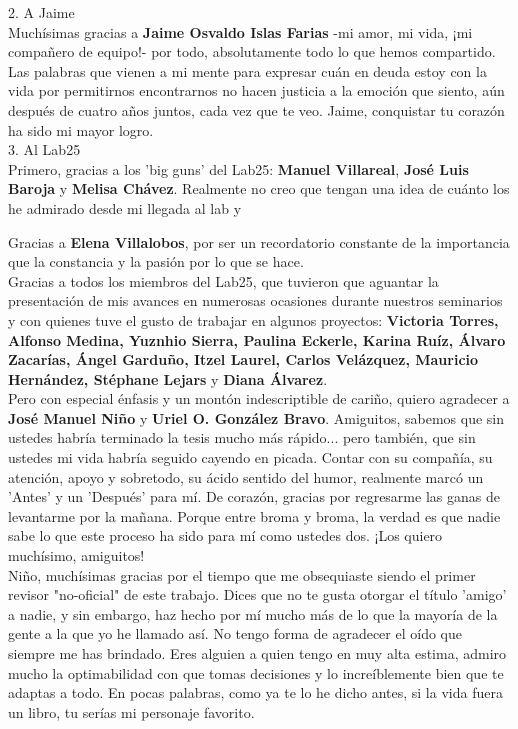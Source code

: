 \documentclass[
12pt, %
spanish, %
singlespacing, %
headsepline, %
]{MastersDoctoralThesis} %
\begin{document}
\begin{acknowledgements}
2. A Jaime\\

Muchísimas gracias a \textbf{Jaime Osvaldo Islas Farias} -mi amor, mi vida, ¡mi compañero de equipo!- por todo, absolutamente todo lo que hemos compartido. Las palabras que vienen a mi mente para expresar cuán en deuda estoy con la vida por permitirnos encontrarnos no hacen justicia a la emoción que siento, aún después de cuatro años juntos, cada vez que te veo. Jaime, conquistar tu corazón ha sido mi mayor logro.\\

3. Al Lab25\\

Primero, gracias a los 'big guns' del Lab25: \textbf{Manuel Villareal}, \textbf{José Luis Baroja} y \textbf{Melisa Chávez}. Realmente no creo que tengan una idea de cuánto los he admirado desde mi llegada al lab y 

Gracias a \textbf{Elena Villalobos}, por ser un recordatorio constante de la importancia que la constancia y la pasión por lo que se hace.\\

Gracias a todos los miembros del Lab25, que tuvieron que aguantar la presentación de mis avances en numerosas ocasiones durante nuestros seminarios y con quienes tuve el gusto de trabajar en algunos proyectos: \textbf{Victoria Torres, Alfonso Medina, Yuznhio Sierra, Paulina Eckerle, Karina Ruíz, Álvaro Zacarías, Ángel Garduño, Itzel Laurel, Carlos Velázquez, Mauricio Hernández, Stéphane Lejars} y \textbf{Diana Álvarez}.\\

Pero con especial énfasis y un montón indescriptible de cariño, quiero agradecer a \textbf{José Manuel Niño} y \textbf{Uriel O. González Bravo}. Amiguitos, sabemos que sin ustedes habría terminado la tesis mucho más rápido... pero también, que sin ustedes mi vida habría seguido cayendo en picada. Contar con su compañía, su atención, apoyo y sobretodo, su ácido sentido del humor, realmente marcó un 'Antes' y un 'Después' para mí. De corazón, gracias por regresarme las ganas de levantarme por la mañana. Porque entre broma y broma, la verdad es que nadie sabe lo que este proceso ha sido para mí como ustedes dos. ¡Los quiero muchísimo, amiguitos!\\

Niño, muchísimas gracias por el tiempo que me obsequiaste siendo el primer revisor "no-oficial" de este trabajo. Dices que no te gusta otorgar el título 'amigo' a nadie, y sin embargo, haz hecho por mí mucho más de lo que la mayoría de la gente a la que yo he llamado así. No tengo forma de agradecer el oído que siempre me has brindado. Eres alguien a quien tengo en muy alta estima, admiro mucho la optimabilidad con que tomas decisiones y lo increíblemente bien que te adaptas a todo. En pocas palabras, como ya te lo he dicho antes, si la vida fuera un libro, tu serías mi personaje favorito.\\


\end{acknowledgements}
\end{document}
